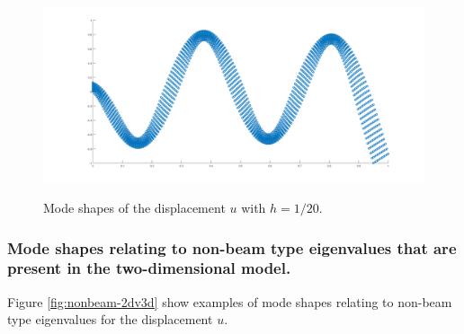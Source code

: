 \begin{figure}[h!]
{{\begin{minipage}[b]{0.8\linewidth}
				\label{fig:minipage2}
			\end{minipage}
			\begin{minipage}[b]{0.8\linewidth}
				\includegraphics[width=1\linewidth]{files/Chapter6/2D6.png}
				\label{fig:minipage1}
			\end{minipage}
			\caption{Mode shapes of the displacement $u$ with $h=1/20$.}
			\label{fig:beam-2dv3d}
	}}
\end{figure}
\FloatBarrier

\subsubsection*{Mode shapes relating to non-beam type eigenvalues that are present in the two-dimensional model.}
Figure \ref{fig:nonbeam-2dv3d} show examples of mode shapes relating to non-beam type eigenvalues for the displacement $u$.

